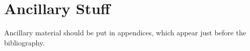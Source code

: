 \chapter{Ancillary Stuff}\label{Apx:Ancillary}

Ancillary material should be put in appendices, which appear just
before the bibliography.
